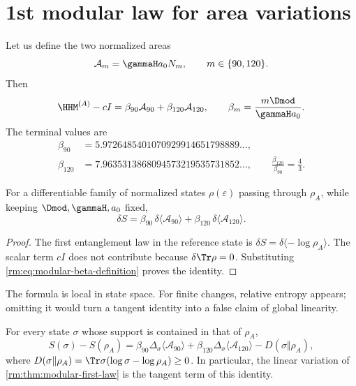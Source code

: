 \section{1st modular law for area variations}

Let us define the two normalized areas
\begin{equation}
\label{rm:eq:modular-normalized-area-channels}
\mathcal A_m=\gammaH a_0N_m,
\qquad m\in\{90,120\}.
\end{equation}
Then
\begin{equation}
\label{rm:eq:modular-beta-definition}
\HHM^{(A)}-cI
=\beta_{90}\mathcal A_{90}+\beta_{120}\mathcal A_{120},
\qquad
\beta_m=\frac{m\Dmod}{\gammaH a_0}.
\end{equation}
The terminal values are
\begin{align}
\beta_{90}&=5.9726485401070929914651798889\ldots,
\label{rm:eq:modular-beta90}\\
\beta_{120}&=7.9635313868094573219535731852\ldots,
\qquad
\frac{\beta_{120}}{\beta_{90}}=\frac43.
\label{rm:eq:modular-beta120}
\end{align}

\begin{theorem}
\label{rm:thm:modular-first-law}
For a differentiable family of normalized states
\(\rho(\varepsilon)\) passing through \(\rho_A\), while keeping
\(\Dmod,\gammaH,a_0\) fixed,
\begin{equation}
\label{rm:eq:modular-first-law}
\boxed{
\delta S
=\beta_{90}\,\delta\langle\mathcal A_{90}\rangle
+\beta_{120}\,\delta\langle\mathcal A_{120}\rangle.}
\end{equation}
\end{theorem}

\begin{proof}
The first entanglement law in the reference state is \(\delta S=\delta\langle-\log\rho_A\rangle\). The
scalar term \(cI\) does not contribute because
\(\delta\Tr\rho=0\). Substituting \cref{rm:eq:modular-beta-definition} proves the identity.
\end{proof}

The formula is local in state space. For finite changes,
relative entropy appears; omitting it would turn a tangent identity into a
false claim of global linearity.

\begin{theorem}
\label{rm:thm:modular-finite-first-law}
For every state \(\sigma\) whose support is contained in that of
\(\rho_A\),
\begin{equation}
\label{rm:eq:modular-finite-first-law}
\boxed{
S(\sigma)-S(\rho_A)
=\beta_{90}\Delta_\sigma\langle\mathcal A_{90}\rangle
+\beta_{120}\Delta_\sigma\langle\mathcal A_{120}\rangle
-D(\sigma\Vert\rho_A),}
\end{equation}
where
\(D(\sigma\Vert\rho_A)=\Tr\sigma(\log\sigma-\log\rho_A)\geq0\).
In particular, the linear variation of
\cref{rm:thm:modular-first-law} is the tangent term of this identity.
\end{theorem}

